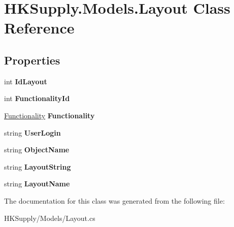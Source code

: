 \hypertarget{class_h_k_supply_1_1_models_1_1_layout}{}\section{H\+K\+Supply.\+Models.\+Layout Class Reference}
\label{class_h_k_supply_1_1_models_1_1_layout}
\subsection*{Properties}
\begin{DoxyCompactItemize}
\item 
\mbox{\label{class_h_k_supply_1_1_models_1_1_layout_aa94d2c594f8a96302e427e4d9d03bcc3}} 
int {\bfseries Id\+Layout}
\item 
\mbox{\label{class_h_k_supply_1_1_models_1_1_layout_a196e69f3e2a4071f2baaba9ae85be02b}} 
int {\bfseries Functionality\+Id}
\item 
\mbox{\label{class_h_k_supply_1_1_models_1_1_layout_a29096b667ccaf97e64099b1b66555a6d}} 
\mbox{\hyperlink{class_h_k_supply_1_1_models_1_1_functionality}{Functionality}} {\bfseries Functionality}
\item 
\mbox{\label{class_h_k_supply_1_1_models_1_1_layout_aea96f9f82a44edeffb5eb00f1a94854e}} 
string {\bfseries User\+Login}
\item 
\mbox{\label{class_h_k_supply_1_1_models_1_1_layout_afdc3d1fdb808e4be195c7bf541941bc2}} 
string {\bfseries Object\+Name}
\item 
\mbox{\label{class_h_k_supply_1_1_models_1_1_layout_a9cf8b5e3c667e1b770293ab0ae3d1ea8}} 
string {\bfseries Layout\+String}
\item 
\mbox{\label{class_h_k_supply_1_1_models_1_1_layout_a2ab461d2f6cf980e81db76e987d979c3}} 
string {\bfseries Layout\+Name}
\end{DoxyCompactItemize}


The documentation for this class was generated from the following file\+:\begin{DoxyCompactItemize}
\item 
H\+K\+Supply/\+Models/Layout.\+cs\end{DoxyCompactItemize}
